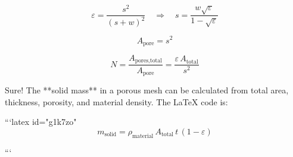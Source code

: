 \[
\varepsilon = \frac{s^2}{(s + w)^2} \quad \Rightarrow \quad s = \frac{w \sqrt{\varepsilon}}{1 - \sqrt{\varepsilon}}
\]

\[
A_{\text{pore}} = s^2
\]

\[
N = \frac{A_{\text{pores,total}}}{A_{\text{pore}}} = \frac{\varepsilon \, A_{\text{total}}}{s^2}
\]

Sure! The **solid mass** in a porous mesh can be calculated from total area, thickness, porosity, and material density. The LaTeX code is:

```latex id="g1k7zo"
\[
m_{\text{solid}} = \rho_{\text{material}} \, A_{\text{total}} \, t \, (1 - \varepsilon)
\]

```


